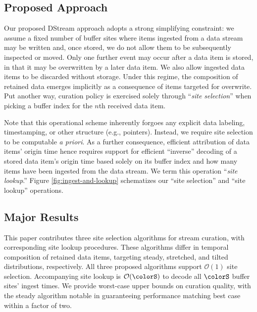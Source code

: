 \subsection{Proposed Approach}


Our proposed DStream approach adopts a strong simplifying constraint: we assume a fixed number of buffer sites where items ingested from a data stream may be written and, once stored, we do not allow them to be subsequently inspected or moved.
Only one further event may occur after a data item is stored, in that it may be overwritten by a later data item.
We also allow ingested data items to be discarded without storage.
Under this regime, the composition of retained data emerges implicitly as a consequence of items targeted for overwrite.
Put another way, curation policy is exercised solely through ``\textit{site selection}'' when picking a buffer index for the $n$th received data item.

Note that this operational scheme inherently forgoes any explicit data labeling, timestamping, or other structure (e.g., pointers).
Instead, we require site selection to be computable \textit{a priori}.
As a further consequence, efficient attribution of data items' origin time hence requires support for efficient ``inverse'' decoding of a stored data item's origin time based solely on its buffer index and how many items have been ingested from the data stream.
We term this operation ``\textit{site lookup}.''
Figure \ref{fig:ingest-and-lookup} schematizes our ``site selection'' and ``site lookup'' operations.



\subsection{Major Results}

This paper contributes three site selection algorithms for stream curation, with corresponding site lookup procedures.
These algorithms differ in temporal composition of retained data items, targeting steady, stretched, and tilted distributions, respectively.
All three proposed algorithms support $\mathcal{O}(1)$ site selection.
Accompanying site lookup is $\mathcal{O}(\colorS)$ to decode all $\colorS$ buffer sites' ingest times.
We provide worst-case upper bounds on curation quality, with the steady algorithm notable in guaranteeing performance matching best case within a factor of two.
